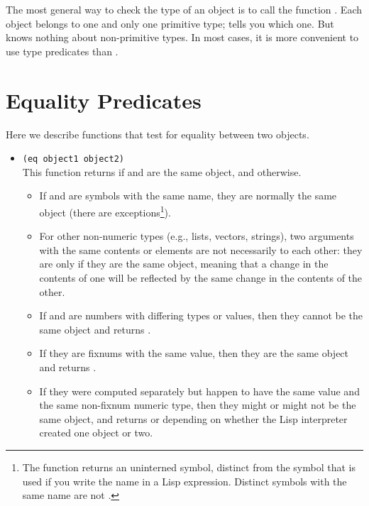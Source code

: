The most general way to check the type of an object is to call the function .
Each object belongs to one and only one primitive type;  tells you which one.
But  knows nothing about non-primitive types.
In most cases, it is more convenient to use type predicates than .

\section{Equality Predicates}
\label{sec:equality-predicates}

Here we describe functions that test for equality between two objects.

\begin{itemize}[itemsep=10pt]
\item \lstinline|(eq object1 object2)|\\
  This function returns  if  and  are the same object, and  otherwise.

  \begin{itemize}
  \item If  and  are symbols with the same name, they are normally the same object (there are exceptions\footnote{
      The  function returns an uninterned symbol, distinct from the symbol that is used if you write the name in a Lisp expression.
      Distinct symbols with the same name are not .}).
  \item For other non-numeric types (e.g., lists, vectors, strings), two arguments with the same contents or elements are not necessarily  to each other: they are  only if they are the same object, meaning that a change in the contents of one will be reflected by the same change in the contents of the other.
  \item If  and  are numbers with differing types or values, then they cannot be the same object and  returns .
  \item If they are fixnums with the same value, then they are the same object and  returns . 
  \item If they were computed separately but happen to have the same value and the same non-fixnum numeric type, then they might or might not be the same object, and  returns  or  depending on whether the Lisp interpreter created one object or two.
  \end{itemize}


\end{itemize}
